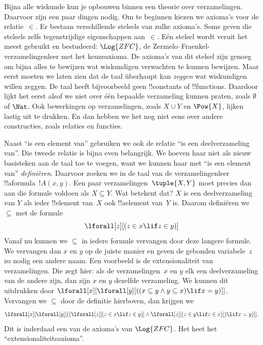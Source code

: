 \documentclass[../../../include/open-logic-section]{subfiles}
\begin{document}


Bijna alle wiskunde kun je opbouwen binnen een theorie over
verzamelingen. Daarvoor zijn een paar dingen nodig. Om te beginnen
kiezen we axioma's voor de relatie~$\in$. Er bestaan verschillende
stelsels van zulke axioma's. Soms geven die stelsels zelfs
tegenstrijdige eigenschappen aan~$\in$. Eén stelsel wordt veruit het
meest gebruikt en bestudeerd: $\Log{ZFC}$, de
Zermelo--Fraenkel-verzamelingenleer met het keuzeaxioma. De axioma's van
dit stelsel zijn genoeg om bijna alles te bewijzen wat wiskundigen
verwachten te kunnen bewijzen. Maar eerst moeten we laten zien dat de
taal überhaupt kan \emph{zeggen} wat wiskundigen willen zeggen. De
taal heeft bijvoorbeeld geen !!{constant}s of !!{function}s. Daardoor
lijkt het eerst alsof we niet over één bepaalde verzameling kunnen
praten, zoals $\emptyset$ of $\Nat$. Ook bewerkingen op verzamelingen,
zoals $X \cup Y$ en $\Pow{X}$, lijken lastig uit te drukken. En dan
hebben we het nog niet eens over andere constructies, zoals relaties en
functies.

Naast ``is een element van'' gebruiken we ook de relatie ``is een
deelverzameling van''. Die tweede relatie is bijna even belangrijk. We
hoeven haar niet als nieuw basisteken aan de taal toe te voegen, want
we kunnen haar met ``is een element van'' \emph{definiëren}. Daarvoor
zoeken we in de taal van de verzamelingenleer !!a{formula}~$!A(x, y)$.
Een paar verzamelingen~$\tuple{X, Y}$ moet precies dan aan die formule
voldoen als $X \subseteq Y$. Wat betekent dat? $X$ is een
deelverzameling van $Y$ als ieder !!{element} van~$X$ ook
!!a{element} van~$Y$ is. Daarom definiëren we $\subseteq$ met de
formule
\[
\lforall[z][(z \in x \lif z \in y)]
\]
Vanaf nu kunnen we $\subseteq$ in iedere formule vervangen door deze
langere formule. We vervangen dan $x$ en $y$ op de juiste manier en
geven de gebonden variabele~$z$ zo nodig een andere naam. Een voorbeeld
is de extensionaliteit van verzamelingen. Die zegt hier: als de
verzamelingen~$x$ en $y$ elk een deelverzameling van de andere zijn,
dan zijn $x$ en $y$ dezelfde verzameling. We kunnen dit uitdrukken door
$\lforall[x][\lforall[y][((x \subseteq y \land y
    \subseteq x) \lif x = y)]]$. Vervangen we $\subseteq$ door de
definitie hierboven, dan krijgen we
\[
\lforall[x][\lforall[y][((\lforall[z][(z \in x \lif z \in y)] \land
    \lforall[z][(z \in y \lif z \in x)]) \lif x = y)]].
\]
Dit is inderdaad een van de axioma's van $\Log{ZFC}$. Het heet het
``extensionaliteitsaxioma''.
\end{document}
